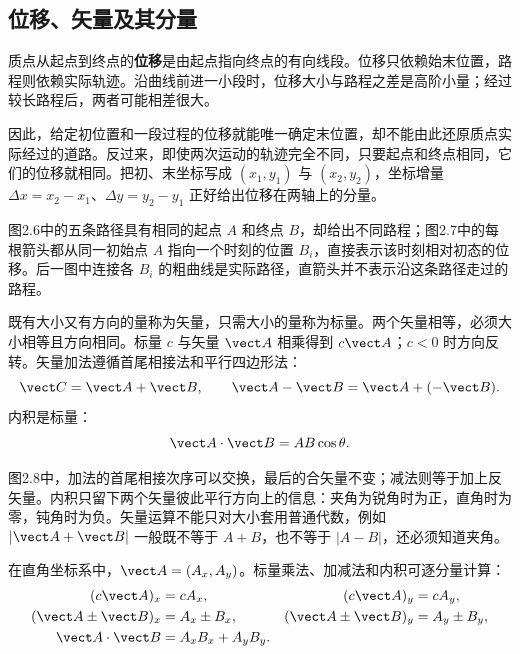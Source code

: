 \subsection{位移、矢量及其分量}

质点从起点到终点的\textbf{位移}是由起点指向终点的有向线段。位移只依赖始末位置，路程则依赖实际轨迹。沿曲线前进一小段时，位移大小与路程之差是高阶小量；经过较长路程后，两者可能相差很大。

因此，给定初位置和一段过程的位移就能唯一确定末位置，却不能由此还原质点实际经过的道路。反过来，即使两次运动的轨迹完全不同，只要起点和终点相同，它们的位移就相同。把初、末坐标写成 $(x_1,y_1)$ 与 $(x_2,y_2)$，坐标增量 $\Delta x=x_2-x_1$、$\Delta y=y_2-y_1$ 正好给出位移在两轴上的分量。

\PathChoicesDiagram

图2.6中的五条路径具有相同的起点 $A$ 和终点 $B$，却给出不同路程；图2.7中的每根箭头都从同一初始点 $A$ 指向一个时刻的位置 $B_i$，直接表示该时刻相对初态的位移。后一图中连接各 $B_i$ 的粗曲线是实际路径，直箭头并不表示沿这条路径走过的路程。

\DisplacementFanDiagram

既有大小又有方向的量称为矢量，只需大小的量称为标量。两个矢量相等，必须大小相等且方向相同。标量 $c$ 与矢量 $\vect A$ 相乘得到 $c\vect A$；$c<0$ 时方向反转。矢量加法遵循首尾相接法和平行四边形法：
\begin{equation}
\vect C=\vect A+\vect B,
\qquad
\vect A-\vect B=\vect A+(-\vect B).
\end{equation}
内积是标量：
\begin{equation}
  \vect A\cdot\vect B=AB\cos\theta.
\end{equation}

\VectorOperationsDiagram

图2.8中，加法的首尾相接次序可以交换，最后的合矢量不变；减法则等于加上反矢量。内积只留下两个矢量彼此平行方向上的信息：夹角为锐角时为正，直角时为零，钝角时为负。矢量运算不能只对大小套用普通代数，例如 $|\vect A+\vect B|$ 一般既不等于 $A+B$，也不等于 $|A-B|$，还必须知道夹角。

在直角坐标系中，$\vect A=(A_x,A_y)$。标量乘法、加减法和内积可逐分量计算：
\begin{align}
(c\vect A)_x&=cA_x,&(c\vect A)_y&=cA_y,\\
(\vect A\pm\vect B)_x&=A_x\pm B_x,&
(\vect A\pm\vect B)_y&=A_y\pm B_y,\\
\vect A\cdot\vect B&=A_xB_x+A_yB_y.
\end{align}

\VectorComponentsDiagram

